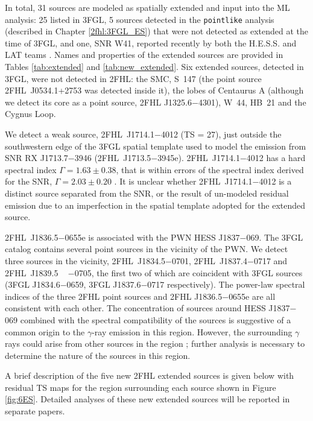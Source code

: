 In total, 31 sources are modeled as spatially extended and input into the ML analysis: 25 listed in 3FGL, 5 sources detected in the {\tt pointlike} analysis (described in Chapter \ref{2fhl:3FGL_ES}) that were not { detected as extended at the time of} 3FGL, and one, SNR W41, reported  recently by both the H.E.S.S. and LAT teams \citep{HESSLATW41}. Names and properties of the extended sources  are provided in Tables \ref{tab:extended} and \ref{tab:new_extended}. 
Six extended sources, detected in 3FGL, were not detected in 2FHL: the SMC, S~147 ({the point source 2FHL~J0534.1+2753 was detected inside it}), the lobes of Centaurus A (although we detect its core as a point source, 2FHL J1325.6$-$4301), W~44, HB~21 and the Cygnus Loop.

We detect a weak source, 2FHL~J1714.1$-$4012 (TS = 27), just outside the southwestern edge of the 3FGL spatial template used to model the emission from SNR RX J1713.7$-$3946 (2FHL~J1713.5$-$3945e). 2FHL~J1714.1$-$4012 has a hard spectral index $\Gamma = 1.63 \pm 0.38$, that is within errors of the spectral index derived for the SNR, $\Gamma = 2.03 \pm 0.20$ \citep{Abdo11-RXJ1713}. It is unclear whether 2FHL~J1714.1$-$4012 is a distinct source separated from the SNR, or the result of un-modeled residual emission due to an imperfection in the spatial template adopted for the extended source.


2FHL~J1836.5$-$0655e is associated with the PWN HESS J1837$-$069. The 3FGL catalog contains  several point sources in the vicinity of the PWN. We detect three sources in the vicinity, 2FHL~J1834.5$-$0701, 2FHL~J1837.4$-$0717 and 2FHL~J1839.5 ~ $-$0705, the first two of which are coincident with 3FGL sources (3FGL J1834.6$-$0659, 3FGL J1837.6$-$0717 respectively). The power-law spectral indices of the three 2FHL point sources and 2FHL J1836.5$-$0655e are all consistent with each other. The concentration of sources around HESS J1837$-$069 combined with the spectral compatibility of the sources is suggestive of a common origin to the $\gamma$-ray emission in this region. However, the surrounding $\gamma$ rays could arise from other sources in the region \citep{Gotthelf08}; further analysis is necessary to determine the nature of the sources in this region. 

A brief description of the five new 2FHL extended sources is given below with residual TS maps for the region surrounding each source shown in Figure \ref{fig:6ES}. Detailed analyses of these new extended sources will be reported in separate papers.


